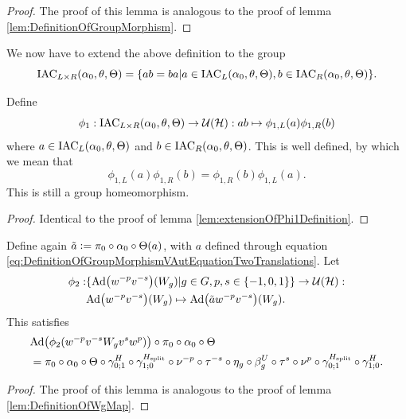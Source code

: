 \documentclass[12pt,a4paper,twoside]{article}
\numberwithin{equation}{section}
\begin{document}
\begin{proof}
	The proof of this lemma is analogous to the proof of lemma \ref{lem:DefinitionOfGroupMorphism}.
\end{proof}
We now have to extend the above definition to the group
\begin{equation}
	\textrm{IAC}_{L\times R}(\alpha_0,\theta,\Theta)=\{ab=ba|a\in\textrm{IAC}_{L}(\alpha_0,\theta,\Theta),b\in\textrm{IAC}_{R}(\alpha_0,\theta,\Theta)\}.
\end{equation}
\begin{lemma}
	Define
	\begin{equation}
		\phi_1:\textrm{IAC}_{L\times R}(\alpha_0,\theta,\Theta)\rightarrow\mathcal U(\mathcal H):ab\mapsto \phi_{1,L}(a)\phi_{1,R}(b)
	\end{equation}
	where $a\in \textrm{IAC}_{L}(\alpha_0,\theta,\Theta)$ and $b\in \textrm{IAC}_{R}(\alpha_0,\theta,\Theta)$. This is well defined, by which we mean that
	\begin{equation}
		\phi_{1,L}(a)\phi_{1,R}(b)=\phi_{1,R}(b)\phi_{1,L}(a).
	\end{equation}
	This is still a group homeomorphism.
\end{lemma}
\begin{proof}
	Identical to the proof of lemma \ref{lem:extensionOfPhi1Definition}.
\end{proof}
\begin{lemma}\label{lem:DefinitionOfWgMapTwoTranslations}
	Define again $\tilde{a}\vcentcolon= \pi_0\circ\alpha_0\circ\Theta(a)$, with $a$ defined through equation \eqref{eq:DefinitionOfGroupMorphismVAutEquationTwoTranslations}. Let
	\begin{align}
		\phi_2:&\{\Ad{w^{-p}v^{-s}}(W_g)|g\in G,p,s\in\{-1,0,1\}\}\rightarrow \UU(\HH):\\
		\nonumber
		&\Ad{w^{-p}v^{-s}}(W_g) \mapsto \Ad{\tilde{a} w^{-p}v^{-s}}(W_g).
	\end{align}
	This satisfies
	\begin{align}\label{eq:lemDefinitionOfWgMapConditionTwoTranslations}
		&\Ad{\phi_2(w^{-p}v^{-s}W_g v^{s} w^p)}\circ\pi_0\circ\alpha_0\circ\Theta\\
		\nonumber
		&=\pi_0\circ \alpha_0\circ\Theta\circ\gamma^{H}_{0;1}\circ\gamma^{H_{\text{split}}}_{1;0}\circ\nu^{-p}\circ\tau^{-s}\circ\eta_g\circ\beta_g^U\circ\tau^s\circ\nu^p\circ\gamma^{H_{\text{split}}}_{0;1}\circ\gamma^{H}_{1;0}.
	\end{align}
\end{lemma}
\begin{proof}
	The proof of this lemma is analogous to the proof of lemma \ref{lem:DefinitionOfWgMap}.
\end{proof}
\end{document}
